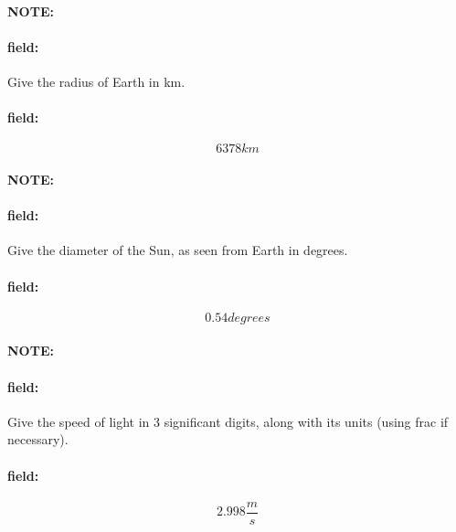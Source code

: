 \documentclass[12pt]{article}
\newenvironment{note}{\paragraph{NOTE:}}{}
\newenvironment{field}{\paragraph{field:}}{}
\begin{document}
\begin{note}
   \begin{field}
       Give the radius of Earth in km.
   \end{field}
   \begin{field}
		\[
			6378km
		\]
   \end{field}
\end{note}

\begin{note}
   \begin{field}
       Give the diameter of the Sun, as seen from Earth in degrees.
   \end{field}
   \begin{field}
		\[
			0.54 degrees
		\]
   \end{field}
\end{note}

\begin{note}
   \begin{field}
       Give the speed of light in 3 significant digits, along with its units (using frac if necessary).
   \end{field}
   \begin{field}
		\[
			2.998\frac{m}{s}
		\]
   \end{field}
\end{note}
\end{document}
